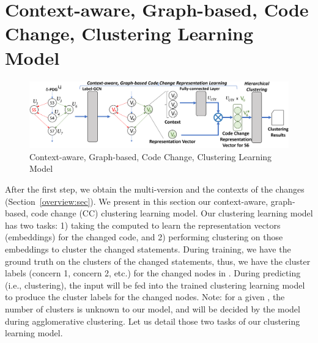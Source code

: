 
\section{Context-aware, Graph-based, Code Change, Clustering Learning Model}
\label{clustering-model:sec}

\begin{figure}[t]
	\centering \includegraphics[width=6in]{figures/STEP_2-new-4.png} %
	\vspace{-8pt}
	\caption{Context-aware, Graph-based, Code Change, Clustering Learning Model}
	\label{fig:step-2}
\end{figure}


After the first step, we obtain the multi-version {\mvpdg} and the
contexts of the changes (Section~\ref{overview:sec}).
We present in this section our context-aware, graph-based, code change
(CC) clustering learning model. Our clustering learning model has two
tasks: 1) taking the computed {\mvpdg} to learn the representation
vectors (embeddings) for the changed code, and 2) performing
clustering on those embeddings to cluster the changed statements.
During training, we have the ground truth on the clusters of the
changed statements, thus, we have the cluster labels (concern 1,
concern 2, etc.) for the changed nodes in {\mvpdg}. During predicting
(i.e., clustering), the input {\mvpdg} will be fed into the trained
clustering learning model to produce the cluster labels for the
changed nodes. Note: for a given {\mvpdg}, the number of clusters is
unknown to our model, and will be decided by the model during
agglomerative clustering. Let us detail those two tasks of our
clustering learning model.



